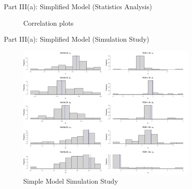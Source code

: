 \documentclass{beamer}
\begin{document}
\begin{frame}{Part III(a): Simplified Model (Statistics Analysis)}
    \begin{figure}
        \centering
        \qquad
        \caption{Correlation plots}
    \end{figure}
\end{frame}

\begin{frame}{Part III(a): Simplified Model (Simulation Study)}
    \begin{figure}[H]
        \centering
        \includegraphics[width=90mm]{sim_study.png}
        \caption{Simple Model Simulation Study}
    \end{figure}
\end{frame}
\end{document}

